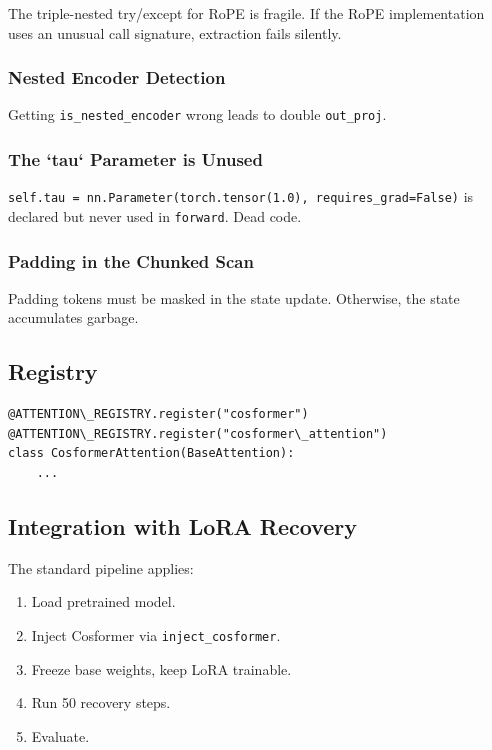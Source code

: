 The triple-nested try/except for RoPE is fragile. If the RoPE implementation 
uses an unusual call signature, extraction fails silently.

\subsubsection{Nested Encoder Detection}

Getting \texttt{is\_nested\_encoder} wrong leads to double \texttt{out\_proj}.

\subsubsection{The `tau` Parameter is Unused}

\texttt{self.tau = nn.Parameter(torch.tensor(1.0), requires\_grad=False)} is 
declared but never used in \texttt{forward}. Dead code.

\subsubsection{Padding in the Chunked Scan}

Padding tokens must be masked in the state update. Otherwise, the state 
accumulates garbage.

\subsection{Registry}

\begin{lstlisting}
@ATTENTION\_REGISTRY.register("cosformer")
@ATTENTION\_REGISTRY.register("cosformer\_attention")
class CosformerAttention(BaseAttention):
    ...
\end{lstlisting}

\subsection{Integration with LoRA Recovery}

The standard pipeline applies:

\begin{enumerate}
\item Load pretrained model.
\item Inject Cosformer via \texttt{inject\_cosformer}.
\item Freeze base weights, keep LoRA trainable.
\item Run 50 recovery steps.
\item Evaluate.

\end{enumerate}
